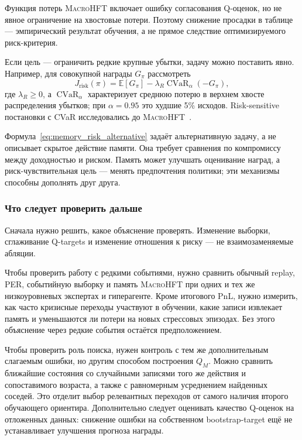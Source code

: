 \documentclass[9pt,a4paper,twocolumn]{extarticle}
\newcommand{\Macro}{\textsc{MacroHFT}}
\begin{document}
Функция потерь \Macro{} включает ошибку согласования Q-оценок, но не явное ограничение на
хвостовые потери. Поэтому снижение просадки в таблице --- эмпирический результат обучения, а не
прямое следствие оптимизируемого риск-критерия.

Если цель --- ограничить редкие крупные убытки, задачу можно поставить явно. Например, для
совокупной награды $G_\pi$ рассмотреть
\begin{equation}
  J_{\mathrm{risk}}(\pi)
  =
  \mathbb E[G_\pi]
  -
  \lambda_R
  \operatorname{CVaR}_{\alpha}(-G_\pi),
  \label{eq:memory_risk_alternative}
\end{equation}
где $\lambda_R\geq0$, а $\operatorname{CVaR}_{\alpha}$ характеризует среднюю потерю в верхнем
хвосте распределения убытков; при $\alpha=0.95$ это худшие 5\% исходов. Risk-sensitive
постановки с CVaR исследовались до \Macro{}~\cite{chow2015cvar}.

Формула~\eqref{eq:memory_risk_alternative} задаёт альтернативную задачу, а не описывает скрытое
действие памяти. Она требует сравнения по компромиссу между доходностью и риском. Память может
улучшать оценивание наград, а риск-чувствительная цель --- менять предпочтения политики; эти
механизмы способны дополнять друг друга.

\subsubsection{Что следует проверить дальше}

Сначала нужно решить, какое объяснение проверять. Изменение выборки, сглаживание Q-targets и
изменение отношения к риску --- не взаимозаменяемые абляции.

Чтобы проверить работу с редкими событиями, нужно сравнить обычный replay, PER, событийную
выборку и память \Macro{} при одних и тех же низкоуровневых экспертах и гиперагенте. Кроме
итогового PnL, нужно измерить, как часто кризисные переходы участвуют в обучении, какие записи
извлекает память и уменьшаются ли потери на новых стрессовых эпизодах. Без этого объяснение
через редкие события остаётся предположением.

Чтобы проверить роль поиска, нужен контроль с тем же дополнительным слагаемым ошибки, но другим
способом построения $Q_M$. Можно сравнить ближайшие состояния со случайными записями того же
действия и сопоставимого возраста, а также с равномерным усреднением найденных соседей. Это
отделит выбор релевантных переходов от самого наличия второго обучающего ориентира.
Дополнительно следует оценивать качество Q-оценок на отложенных данных: снижение ошибки на
собственном bootstrap-target ещё не устанавливает улучшения прогноза награды.
\end{document}
